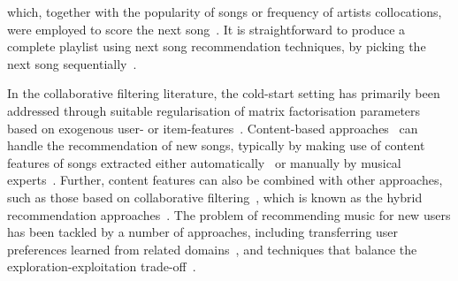 which, together with the popularity of songs or frequency of artists collocations,
were employed to score the next song~\cite{mcfee2012million,bonnin2013evaluating}.
It is straightforward to produce a complete playlist using next song recommendation techniques,
\ie by picking the next song sequentially~\cite{bonnin2013evaluating,ben2017groove}.
%


In the collaborative filtering literature,
the cold-start setting has primarily been addressed through
suitable regularisation of matrix factorisation parameters
based on exogenous user- or item-features~\cite{Ma:2008,Agarwal:2009,Cao:2010}.
%
Content-based approaches~\cite[chap. 4]{aggarwal2016recommender}
can handle the recommendation of new songs,
typically by making use of content features of songs extracted either automatically~\cite{seyerlehner2010automatic,eghbal2015vectors}
or manually by musical experts~\cite{john2006pandora}.
Further, content features can also be combined with other approaches, such as those based on 
collaborative filtering~\cite{yoshii2006hybrid,donaldson2007hybrid,shao2009music},
which is known as the hybrid recommendation approaches~\cite{burke2002hybrid,aggarwal2016recommender}.
The problem of recommending music for %
new users has been tackled by a number of approaches, including transferring user preferences learned 
from related domains~\cite{hu2010study,aizenberg2012build},
and techniques that balance the exploration-exploitation trade-off~\cite{wang2014exploration,liebman2015dj}.


